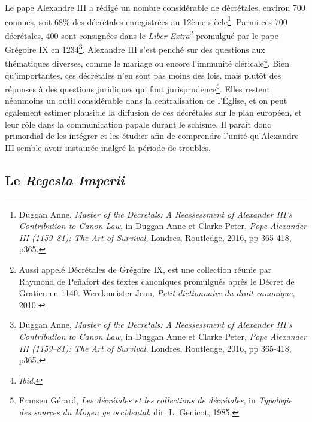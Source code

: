Le pape Alexandre III a rédigé un nombre considérable de décrétales, environ 700 connues, soit 68\% des décrétales enregistrées au 12ème siècle\footnote{ Duggan Anne, \textit{Master of the Decretals: A Reassessment of Alexander III’s Contribution to Canon Law}, in Duggan Anne et Clarke Peter, \textit{Pope Alexander III (1159–81): The Art of Survival}, Londres, Routledge, 2016, pp 365-418, p365.}. Parmi ces 700 décrétales, 400 sont consignées dans le \textit{Liber Extra}\footnote{Aussi appelé Décrétales de Grégoire IX, est une collection réunie par Raymond de Peñafort des textes canoniques promulgués après le Décret de Gratien en 1140. Werckmeister Jean, \textit{Petit dictionnaire du droit canonique}, 2010.} promulgué par le pape Grégoire IX en 1234\footnote{Duggan Anne, \textit{Master of the Decretals: A Reassessment of Alexander III’s Contribution to Canon Law}, in Duggan Anne et Clarke Peter, \textit{Pope Alexander III (1159–81): The Art of Survival}, Londres, Routledge, 2016, pp 365-418, p365.}. Alexandre III s’est penché sur des questions aux thématiques diverses, comme le mariage ou encore l’immunité cléricale\footnote{\textit{Ibid.}}. Bien qu’importantes, ces décrétales n’en sont pas moins des lois, mais plutôt des réponses à des questions juridiques qui font jurisprudence\footnote{Fransen Gérard, \textit{Les décrétales et les collections de décrétales}, in \textit{Typologie des sources du Moyen  ge occidental}, dir. L. Genicot, 1985.}. Elles restent néanmoins un outil considérable dans la centralisation de l'Église, et on peut également estimer plausible la diffusion de ces décrétales sur le plan européen, et leur rôle dans la communication papale durant le schisme. Il paraît donc primordial de les intégrer et les étudier afin de comprendre l’unité qu’Alexandre III semble avoir instaurée malgré la période de troubles.

 
    \subsection{Le \textit{Regesta Imperii}}

